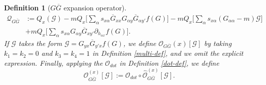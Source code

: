 \documentclass{article}
\makeatletter
\newcommand{\1}{\mathds{1}}
\numberwithin{equation}{section}
\newcommand{\al}{\alpha}
\renewcommand{\cal}{\mathcal}
\newcommand{\wh}{\widehat}
\theoremstyle{plain} %
\newtheorem{definition}[theorem]{Definition}
\theoremstyle{remark}
\newtheorem{remark}[theorem]{Remark}
\renewcommand{\subsection}{\@startsection
	{subsection}%
	{2}%
	{0mm}%
	{-\baselineskip}%
	{0.5\baselineskip}%
	{\normalfont\bf\itshape}} %
\makeatother
\begin{document}
\begin{definition} [$G\overline G$ expansion operator]
\begin{align*}
		\cal Q_{G\overline G}&:= Q_x \left(\cal G\right) -  m Q_x\Big[ \sum_\al s_{x\al }\overline G_{xx}G_{\al y} \overline G_{\al y'} f(G) \Big] - m Q_x\Big[\sum_\al s_{x\al }\left(G_{\al \al} -m \right) \cal G\Big] \\
		& + mQ_x\Big[  \sum_\al s_{x\al }G_{\al y}  \overline G_{xy'} \partial_{ h_{\al x}} f(G) \Big].
	\end{align*}
	If $\cal G$ takes the form $\cal G= G_{yx}  \overline G_{y'x} f(G)$, we define $\cal O_{G\overline G}(x)[ \cal G] $ by taking $k_1=k_2=0$ and $k_3=k_4=1$ in Definition \ref{multi-def}, and we omit the explicit expression. Finally, applying the $\cal O_{dot}$ in Definition \ref{dot-def}, we define
	$${\cal O}_{G\overline G}^{(x)}[ \cal G]:= \cal O_{dot} \circ  \wh{\cal O}_{G\overline G}^{(x)}   [\cal G]. $$  
\end{definition}
  
  
  



\end{document}
